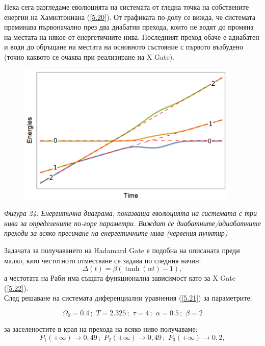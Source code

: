     Нека сега разгледаме еволюцията на системата от гледна точка на собствените енергии на Хамилтониана (\ref{5.20}). От графиката по-долу се вижда, че системата
    преминава първоначално през два диабатни прехода, които не водят до промяна на местата на някое от енергетичните нива. Последният преход обаче е адиабатен и
    води до обръщане на местата на основното състояние с първото възбудено (точно каквото се очаква при реализиране на X Gate).

    \begin{figure}[H]
        \centering
        \includegraphics[width=300pt]{26.png}
    \end{figure}
    \begin{center}
        \small \textit{Фигура 24: Енергитична диаграма, показваща еволюцията на системата с три нива за определените по-горе параметри. Виждат се диабатните/адиабатните преходи
        за всяко пресичане на енергетичните нива (червения пунктир)}\\
    \end{center}

    Задачата за получаването на Hadamard Gate е подобна на описаната преди малко, като честотното отместване се задава по следния начин:
    \begin{equation}
        \Delta(t) = \beta \left(\tanh(\alpha t)-1\right),
    \end{equation}
    а честотата на Раби има същата функционална зависимост като за X Gate (\ref{5.22}).\\
    След решаване на системата диференциални уравнения (\ref{5.21}) за параметрите:

    \begin{equation}
        \Omega_0 = 0.4\, ;\,\,T = 2.325\, ;\,\,\tau = 4\, ;\,\,\alpha = 0.5\, ;\,\,\beta = 2
    \end{equation}

    за заселеностите в края на прехода на всяко ниво получаваме:
    \begin{equation}
        P_1(+\infty) \rightarrow 0,49 \, ;\,\, P_2(+\infty) \rightarrow 0,49 \, ;\,\, P_3(+\infty) \rightarrow 0,2,
    \end{equation}

